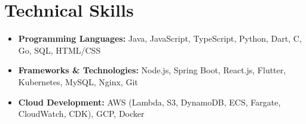 \documentclass[10pt]{resume}
\begin{document}
\section{Technical Skills} 
\begin{itemize}[parsep=0.5ex]
  \item \textbf{Programming Languages:} Java, JavaScript, TypeScript, Python, Dart, C, Go, SQL, HTML/CSS
  \item \textbf{Frameworks \& Technologies:} Node.js, Spring Boot, React.js, Flutter, Kubernetes, MySQL, Nginx, Git
  \item \textbf{Cloud Development:} AWS (Lambda, S3, DynamoDB, ECS, Fargate, CloudWatch, CDK), GCP, Docker
\end{itemize}
 

%
%
\end{document}
